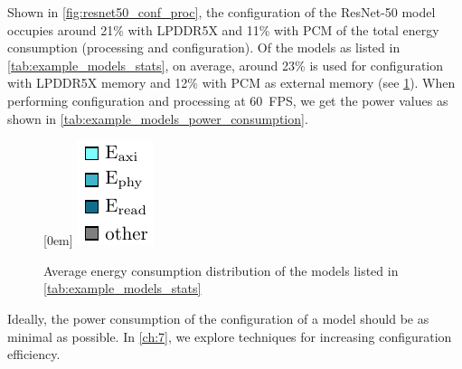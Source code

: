 Shown in \cref{fig:resnet50_conf_proc}, the configuration of the ResNet-50 model occupies around 21\% with LPDDR5X and 11\% with PCM of the total energy consumption (processing and configuration).
Of the models as listed in \cref{tab:example_models_stats}, on average, around 23\% is used for configuration with LPDDR5X memory and 12\% with PCM as external memory (see \cref{fig:example_models_avg_conf_proc}).
When performing configuration and processing at \SI{60}{FPS}, we get the power values as shown in \cref{tab:example_models_power_consumption}.

\begin{figure}[hbtp]
    \centering
    \hfill
    \subcaptionbox*{}[0em]{
        \includegraphics{assets/legend.pdf}
    }
    \hfill
    \caption{Average energy consumption distribution of the models listed in \cref{tab:example_models_stats}}
    \label{fig:example_models_avg_conf_proc}
\end{figure}

Ideally, the power consumption of the configuration of a model should be as minimal as possible.
In \cref{ch:7}, we explore techniques for increasing configuration efficiency.

